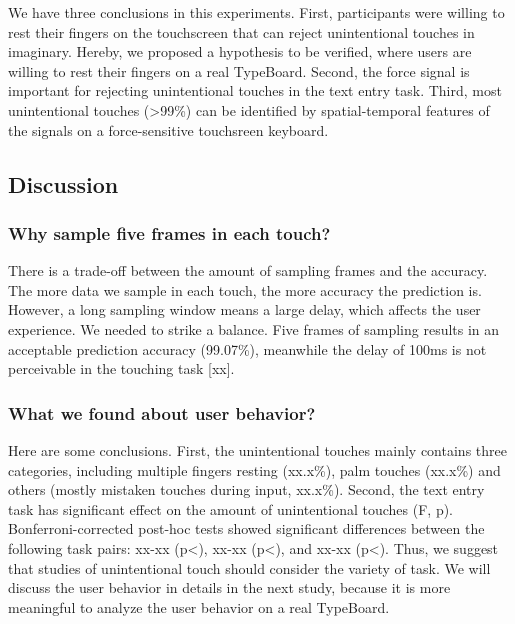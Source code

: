 We have three conclusions in this experiments. First, participants were willing to rest their fingers on the touchscreen that can reject unintentional touches in imaginary. Hereby, we proposed a hypothesis to be verified, where users are willing to rest their fingers on a real TypeBoard. Second, the force signal is important for rejecting unintentional touches in the text entry task. Third, most unintentional touches (>99\%) can be identified by spatial-temporal features of the signals on a force-sensitive touchsreen keyboard.


\subsection{Discussion}

\subsubsection{Why sample five frames in each touch?} There is a trade-off between the amount of sampling frames and the accuracy. The more data we sample in each touch, the more accuracy the prediction is. However, a long sampling window means a large delay, which affects the user experience. We needed to strike a balance. Five frames of sampling results in an acceptable prediction accuracy (99.07\%), meanwhile the delay of 100ms is not perceivable in the touching task [xx].


\subsubsection{What we found about user behavior?} Here are some conclusions. First, the unintentional touches mainly contains three categories, including multiple fingers resting (xx.x\%), palm touches (xx.x\%) and others (mostly mistaken touches during input, xx.x\%). Second, the text entry task has significant effect on the amount of unintentional touches (F, p). Bonferroni-corrected post-hoc tests showed significant differences between the following task pairs: xx-xx (p<), xx-xx (p<), and xx-xx (p<). Thus, we suggest that studies of unintentional touch should consider the variety of task. We will discuss the user behavior in details in the next study, because it is more meaningful to analyze the user behavior on a real TypeBoard.

